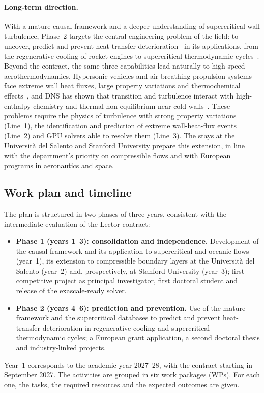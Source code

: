 \documentclass[11pt]{article}
\begin{document}
\paragraph{Long-term direction.} With a mature causal framework and a deeper understanding
of supercritical wall turbulence, Phase~2 targets the central engineering problem of the
field: to uncover, predict and prevent heat-transfer deterioration~\cite{Pizzarelli2018,Yoo2013}
in its applications, from the regenerative cooling of rocket engines to supercritical
thermodynamic cycles~\cite{Ahn2015}. Beyond the contract, the same three capabilities lead
naturally to high-speed aerothermodynamics. Hypersonic vehicles and air-breathing
propulsion systems face extreme wall heat fluxes, large property variations and
thermochemical effects~\cite{Urzay2018}, and DNS has shown that transition and turbulence
interact with high-enthalpy chemistry and thermal non-equilibrium near cold
walls~\cite{DiRenzoUrzay2021,Passiatore2022}. These problems require the physics of
turbulence with strong property variations (Line~1), the identification and prediction of
extreme wall-heat-flux events (Line~2) and GPU solvers able to resolve them (Line~3). The
stays at the Universit\`a del Salento and Stanford University prepare this extension, in
line with the department's priority on compressible flows and with European programs in
aeronautics and space.

\subsection{Work plan and timeline}
The plan is structured in two phases of three years, consistent with the intermediate
evaluation of the Lector contract:
\begin{itemize}
  \item \textbf{Phase 1 (years 1--3): consolidation and independence.} Development of the
  causal framework and its application to supercritical and oceanic flows (year~1), its
  extension to compressible boundary layers at the Universit\`a del Salento (year~2) and,
  prospectively, at Stanford University (year~3); first competitive project as principal
  investigator, first doctoral student and release of the exascale-ready solver.
  \item \textbf{Phase 2 (years 4--6): prediction and prevention.} Use of the mature
  framework and the supercritical databases to predict and prevent heat-transfer
  deterioration in regenerative cooling and supercritical thermodynamic cycles; a European
  grant application, a second doctoral thesis and industry-linked projects.
\end{itemize}
Year~1 corresponds to the academic year 2027--28, with the contract starting in September
2027.
The activities are grouped in six work packages (WPs). For each one, the tasks, the
required resources and the expected outcomes are given.
\end{document}
